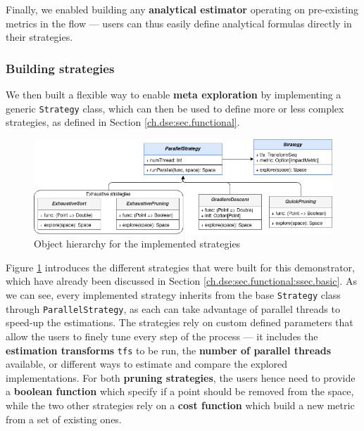             Finally, we enabled building any {\bf analytical estimator} operating on pre-existing metrics in the flow --- users can thus easily define analytical formulas directly in their strategies.

        \subsubsection{Building strategies}
            We then built a flexible way to enable {\bf meta exploration} by implementing a generic \lstinline{Strategy} class, which can then be used to define more or less complex strategies, as defined in Section \ref{ch.dse:sec.functional}.

            \begin{figure}[h!]
                \centering
                \includegraphics[width=1.0\textwidth]{Figures/Implementation-Strategies.png}
                \caption{Object hierarchy for the implemented strategies}
                \label{ch.expe:sec.qece:ssec.impl:fig.strategies}
            \end{figure}

            Figure \ref{ch.expe:sec.qece:ssec.impl:fig.strategies} introduces the different strategies that were built for this demonstrator, which have already been discussed in Section \ref{ch.dse:sec.functional:ssec.basic}.
            As we can see, every implemented strategy inherits from the base \lstinline{Strategy} class through \lstinline{ParallelStrategy}, as each can take advantage of parallel threads to speed-up the estimations.
            The strategies rely on custom defined parameters that allow the users to finely tune every step of the process --- it includes the {\bf estimation transforms} \lstinline{tfs} to be run, the {\bf number of parallel threads} available, or different ways to estimate and compare the explored implementations. 
            For both {\bf pruning strategies}, the users hence need to provide a {\bf boolean function} which specify if a point should be removed from the space, while the two other strategies rely on a {\bf cost function} which build a new metric from a set of existing ones.

